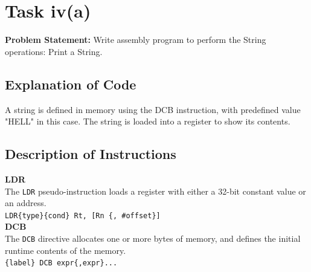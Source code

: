 \documentclass[footheight=20pt, footsepline, headheight=20pt, headsepline]{scrartcl}
\begin{document}
\FloatBarrier
\section*{Task iv(a)}
\textbf{Problem Statement:} Write assembly program to perform the String operations: Print a String.
\subsection*{Explanation of Code}
A string is defined in memory using the DCB instruction, with predefined value "HELL" in this case. The string is loaded into a register to show its contents.
\subsection*{Description of Instructions}
\textbf{LDR}\\
The \verb|LDR| pseudo-instruction loads a register with either a 32-bit constant value or an address.\\
\verb|LDR{type}{cond} Rt, [Rn {, #offset}]| \\
\textbf{DCB}\\
The \verb|DCB| directive allocates one or more bytes of memory, and defines the initial runtime contents of the memory.\\
\verb|{label} DCB expr{,expr}...|\\




\FloatBarrier
\end{document}
